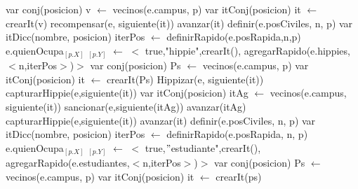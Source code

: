 \begin{algorithm}[H]
\begin{algorithmic}[1]
 
 
		 
			\State var conj(posicion) v $\gets$ vecinos(e.campus, p) 
			\State var itConj(posicion) it $\gets$ crearIt(v) 
				 
					\State recompensar(e, siguiente(it)) 
				\EndIf
				\State avanzar(it)	
			\EndWhile
		\Else
			\State definir(e.posCiviles, n, p)  
			\State var itDicc(nombre, posicion) iterPos $\gets$ definirRapido(e.posRapida,n,p) 
			\State e.quienOcupa$_{[p.X]}$ $_{[p.Y]}$ $\gets$ $<$ true,"hippie",crearIt(), agregarRapido(e.hippies,$<$n,iterPos$>$)$>$ 
			\State var conj(posicion) Ps $\gets$ vecinos(e.campus, p) 
			\State var itConj(posicion) it $\gets$ crearIt(Ps) 
				 
					\State Hippizar(e, siguiente(it)) 
					 
						\State capturarHippie(e,siguiente(it)) 
					\EndIf
				\Else
					 
						\State var itConj(posicion) itAg $\gets$ vecinos(e.campus, siguiente(it)) 
						  
							 
								\State sancionar(e,siguiente(itAg)) 
							\EndIf
							\State avanzar(itAg)	
						\EndWhile
					\Else
						  
							\State capturarHippie(e,siguiente(it)) 
						\EndIf
					\EndIf
				  \EndIf
					\State avanzar(it)	
				\EndWhile
			  \EndIf
			\Else
				\State definir(e.posCiviles, n, p)  
				\State var itDicc(nombre, posicion) iterPos $\gets$ definirRapido(e.posRapida, n, p)  
				\State e.quienOcupa$_{[p.X]}$ $_{[p.Y]}$ $\gets$ $<$ true,$"$estudiante",crearIt(), agregarRapido(e.estudiantes,$<$n,iterPos$>$)$>$
				\State var conj(posicion) Ps $\gets$ vecinos(e.campus, p) 
				\State var itConj(posicion) it $\gets$ crearIt(ps) 
\EndFunction
\end{algorithmic}
\end{algorithm}

